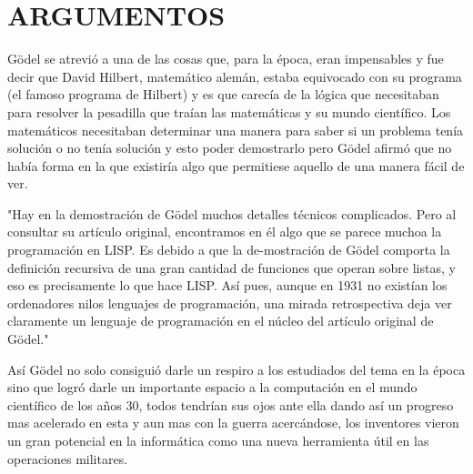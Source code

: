 \documentclass[12pt,letterpaper]{article}
\begin{document}




\section{ARGUMENTOS} 

Gödel se atrevió a una de las cosas que, para la época, eran impensables y fue decir que David Hilbert, matemático alemán, estaba equivocado con su programa (el famoso programa de Hilbert) y es que carecía de la lógica que necesitaban para resolver la pesadilla que traían las matemáticas y su mundo científico. Los matemáticos necesitaban determinar una manera para saber si un problema tenía solución o no tenía solución y esto poder demostrarlo pero Gödel afirmó que no había forma en la que existiría algo que permitiese aquello de una manera fácil de ver.

"Hay  en  la  demostración  de  Gödel  muchos  detalles técnicos  complicados.  Pero  al  consultar  su  artículo original,  encontramos  en  él  algo  que  se  parece  muchoa  la  programación  en  LISP.  Es  debido  a  que  la  de-mostración  de  Gödel  comporta  la  definición  recursiva de  una  gran  cantidad  de  funciones  que  operan  sobre listas,  y  eso  es  precisamente  lo  que  hace  LISP.  Así pues,  aunque  en  1931  no  existían  los  ordenadores  nilos  lenguajes  de  programación,  una  mirada  retrospectiva  deja  ver  claramente  un  lenguaje  de  programación en  el  núcleo  del  artículo  original  de  Gödel."\cite{chaitin2003ordenadores}

Así Gödel no solo consiguió darle un respiro a los estudiados del tema en la época sino que logró darle un importante espacio a la computación en el mundo científico de los años 30, todos tendrían sus ojos ante ella dando así un progreso mas acelerado en esta y aun mas con la guerra acercándose, los inventores vieron un gran potencial en la informática como una nueva herramienta útil en las operaciones militares.
\end{document}
